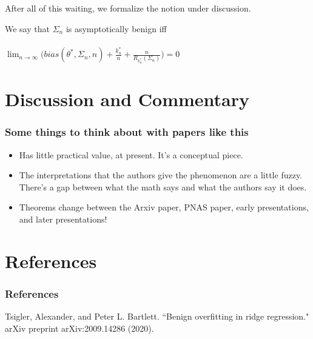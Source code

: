 \documentclass[pdf]{beamer}
\begin{document}
\begin{frame}
After all of this waiting, we formalize the notion under discussion.

\begin{definition}
We say that $\Sigma_{n}$ is asymptotically benign iff \\~\\

$\displaystyle \lim_{n\to\infty} \big ( bias(\theta^{*}, \Sigma_{n}, n)  + \frac{k^{*}_{n}}{n} +  \frac{n}{R_{k^{*}_{n}}(\Sigma_{n})} \big ) = 0$

\end{definition}
\end{frame}


\section{Discussion and Commentary}

\begin{frame}
\frametitle{Some things to think about with papers like this}
\begin{itemize}
\item Has little practical value, at present.  It's a conceptual piece.
\item The interpretations that the authors give the phenomenon are a little fuzzy.  There's a gap between what the math says and what the authors say it does.
\item Theorems change between the Arxiv paper, PNAS paper, early presentations, and later presentations!
\end{itemize}
\end{frame}


\section*{References}

\begin{frame}[t, allowframebreaks]
\frametitle{References}
Tsigler, Alexander, and Peter L. Bartlett. ``Benign overfitting in ridge regression." arXiv preprint arXiv:2009.14286 (2020).
\end{frame}
\end{document}
